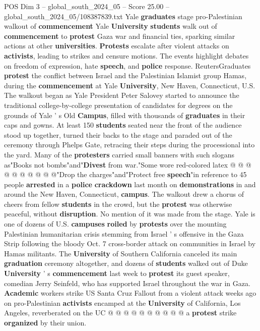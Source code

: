 \begin{textsample}{POS Dim 3 – global\_south\_2024\_05 – Score 25.00 – global\_south\_2024\_05/108387839.txt}  \label{ex:f3_pos_102}
Yale \textbf{graduates} stage pro-Palestinian walkout of \textbf{commencement} Yale \textbf{University} \textbf{students} walk out of \textbf{commencement} to \textbf{protest} Gaza war and financial ties, sparking similar actions at other \textbf{universities}. \textbf{Protests} escalate after violent attacks on \textbf{activists}, leading to strikes and censure motions.
The events highlight debates on freedom of expression, hate \textbf{speech}, and \textbf{police} response.
ReutersGraduates \textbf{protest} the conflict between Israel and the Palestinian Islamist group Hamas, during the \textbf{commencement} at Yale \textbf{University}, New Haven, Connecticut, U.S.
The walkout began as Yale President Peter Salovey started to announce the traditional college-by-college presentation of candidates for degrees on the grounds of Yale ' s Old \textbf{Campus}, filled with thousands of \textbf{graduates} in their caps and gowns.
At least 150 \textbf{students} seated near the front of the audience stood up together, turned their backs to the stage and paraded out of the ceremony through Phelps Gate, retracing their steps during the processional into the yard.
Many of the \textbf{protesters} carried small banners with such slogans as"Books not bombs"and"\textbf{Divest} from war."Some wore red-colored latex @ @ @ @ @ @ @ @ @ @"Drop the charges"and"Protect free \textbf{speech}"in reference to 45 people \textbf{arrested} in a \textbf{police} \textbf{crackdown} last month on \textbf{demonstrations} in and around the New Haven, Connecticut, \textbf{campus}.
The walkout drew a chorus of cheers from fellow \textbf{students} in the crowd, but the \textbf{protest} was otherwise peaceful, without \textbf{disruption}.
No mention of it was made from the stage.
Yale is one of dozens of U.S. \textbf{campuses} \textbf{roiled} by \textbf{protests} over the mounting Palestinian humanitarian crisis stemming from Israel ' s offensive in the Gaza Strip following the bloody Oct. 7 cross-border attack on communities in Israel by Hamas militants.
The \textbf{University} of Southern California canceled its main \textbf{graduation} ceremony altogether, and dozens of \textbf{students} walked out of Duke \textbf{University} ' s \textbf{commencement} last week to \textbf{protest} its guest speaker, comedian Jerry Seinfeld, who has supported Israel throughout the war in Gaza. \textbf{Academic} workers strike US Santa Cruz Fallout from a violent attack weeks ago on pro-Palestinian \textbf{activists} encamped at the \textbf{University} of California, Los Angeles, reverberated on the UC @ @ @ @ @ @ @ @ @ @ a \textbf{protest} strike \textbf{organized} by their union.

\end{textsample}
